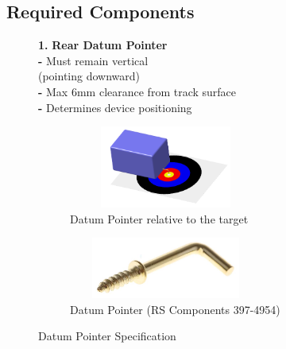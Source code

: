 \documentclass{article}
\newcommand{\wm}[2]{%
	\begin{minipage}{#1\textwidth}
		\centering
		#2
	\end{minipage}%
}
\begin{document}
\subsection{Required Components}
\begin{itemize}[itemsep=-0.7mm]
	
	\begin{figure}[H]
	\begin{minipage}{0.4\textwidth}	
	\centering\wm{0.8}{
	\item[\textbf{1.}] \textbf{Rear Datum Pointer}\\
		\textbf{-} Must remain vertical\\ 
		(pointing downward)\\
		\textbf{-} Max 6mm clearance from track surface\\
		\textbf{-} Determines device positioning
	}
	\end{minipage}\hspace{-2em}
	\begin{minipage}{0.7\textwidth}	
		\centering
		\begin{subfigure}[t]{0.45\textwidth}
			\centering
			\includegraphics[width=0.7\textwidth,height=2.7cm]{extracted_images/image_10_2.png}
			\caption{Datum Pointer relative to the target}
			\label{fig:datumall}
		\end{subfigure}\hspace*{1em}
		\begin{subfigure}[t]{0.45\textwidth}
			\centering
			\includegraphics[width=0.7\textwidth,height=2cm]{extracted_images/image_10_1.png}
			\caption{Datum Pointer (RS Components 397-4954)}
			\label{fig:datum}
		\end{subfigure}
		\caption{Datum Pointer Specification}
	\end{minipage}
	\end{figure}


\end{itemize}
\end{document}
